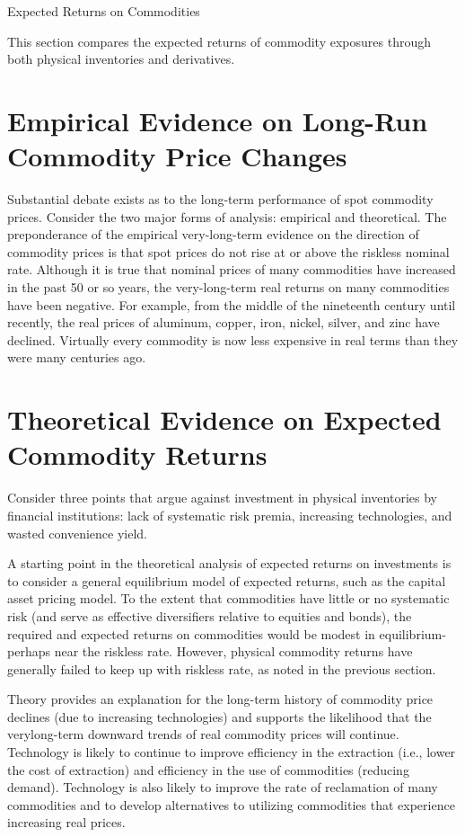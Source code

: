 \documentclass[11pt]{article}
\begin{document}
Expected Returns on Commodities

This section compares the expected returns of commodity exposures through both physical inventories and derivatives.

\section*{Empirical Evidence on Long-Run Commodity Price Changes}
Substantial debate exists as to the long-term performance of spot commodity prices. Consider the two major forms of analysis: empirical and theoretical. The preponderance of the empirical very-long-term evidence on the direction of commodity prices is that spot prices do not rise at or above the riskless nominal rate. Although it is true that nominal prices of many commodities have increased in the past 50 or so years, the very-long-term real returns on many commodities have been negative. For example, from the middle of the nineteenth century until recently, the real prices of aluminum, copper, iron, nickel, silver, and zinc have declined. Virtually every commodity is now less expensive in real terms than they were many centuries ago.

\section*{Theoretical Evidence on Expected Commodity Returns}
Consider three points that argue against investment in physical inventories by financial institutions: lack of systematic risk premia, increasing technologies, and wasted convenience yield.

A starting point in the theoretical analysis of expected returns on investments is to consider a general equilibrium model of expected returns, such as the capital asset pricing model. To the extent that commodities have little or no systematic risk (and serve as effective diversifiers relative to equities and bonds), the required and expected returns on commodities would be modest in equilibrium-perhaps near the riskless rate. However, physical commodity returns have generally failed to keep up with riskless rate, as noted in the previous section.

Theory provides an explanation for the long-term history of commodity price declines (due to increasing technologies) and supports the likelihood that the verylong-term downward trends of real commodity prices will continue. Technology is likely to continue to improve efficiency in the extraction (i.e., lower the cost of extraction) and efficiency in the use of commodities (reducing demand). Technology is also likely to improve the rate of reclamation of many commodities and to develop alternatives to utilizing commodities that experience increasing real prices.
\end{document}
